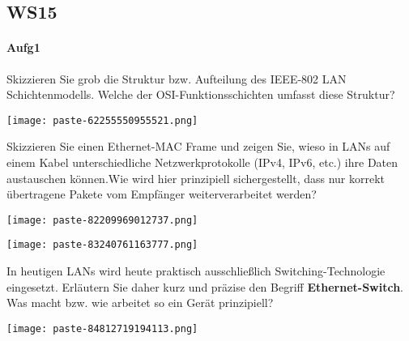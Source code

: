 \documentclass{article}
\begin{document}
\subsection{WS15}
\paragraph{Aufg1}
\begin{tcolorbox}[colback=white!10!white,colframe=lightgray!75!black,
  savelowerto=\jobname_ex.tex,breakable,enhanced,lines before break=40]

\justifying
Skizzieren Sie grob die Struktur bzw. Aufteilung des IEEE-802 LAN Schichtenmodells. Welche der OSI-Funktionsschichten umfasst diese Struktur?

\tcblower

\justifying
\begin{center}
\texttt{[image: paste-62255550955521.png]}
\end{center}

\end{tcolorbox}
\begin{tcolorbox}[colback=white!10!white,colframe=lightgray!75!black,
  savelowerto=\jobname_ex.tex,breakable,enhanced,lines before break=40]

\justifying
Skizzieren Sie einen Ethernet-MAC Frame und zeigen Sie, wieso in LANs auf einem Kabel unterschiedliche Netzwerkprotokolle (IPv4, IPv6, etc.) ihre Daten austauschen können.Wie wird hier prinzipiell sichergestellt, dass nur korrekt übertragene Pakete vom Empfänger weiterverarbeitet werden?

\tcblower

\justifying
\begin{center}
\texttt{[image: paste-82209969012737.png]}
\end{center}
\begin{center}
\texttt{[image: paste-83240761163777.png]}
\end{center}

\end{tcolorbox}
\begin{tcolorbox}[colback=white!10!white,colframe=lightgray!75!black,
  savelowerto=\jobname_ex.tex,breakable,enhanced,lines before break=40]

\justifying
In heutigen LANs wird heute praktisch ausschließlich Switching-Technologie eingesetzt. Erläutern Sie daher kurz und präzise den Begriff \textbf{Ethernet-Switch}. Was macht bzw. wie arbeitet so ein Gerät prinzipiell?

\tcblower

\justifying
\begin{center}
\texttt{[image: paste-84812719194113.png]}
\end{center}

\end{tcolorbox}
\end{document}
